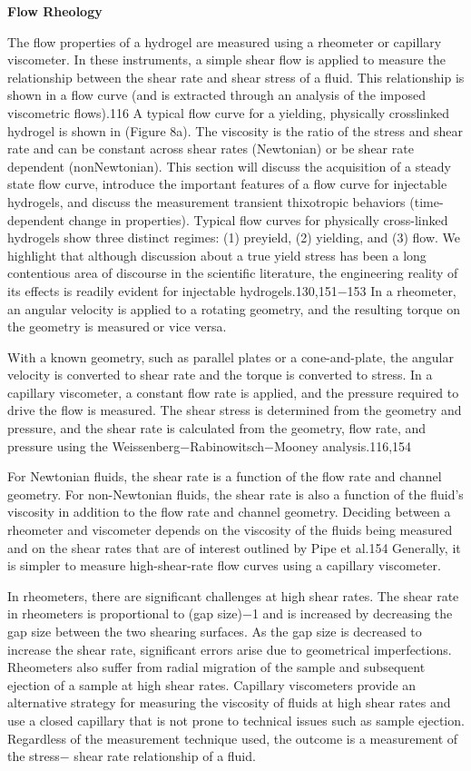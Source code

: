 \documentclass[../../main-notes.tex]{subfiles}
\begin{document}
\textbf{Flow Rheology}

The flow properties of a hydrogel are measured using a rheometer or capillary viscometer.  
In these instruments, a simple shear flow is applied to measure the relationship between the shear rate and shear stress of a fluid. 
This relationship is shown in a flow curve (and is extracted through an analysis of the imposed viscometric  flows).116 
A typical flow curve for a yielding, physically crosslinked hydrogel is shown in (Figure 8a). 
The viscosity is the ratio of the stress and shear rate and can be constant across shear rates (Newtonian) or be shear rate dependent (nonNewtonian). 
This section will discuss the acquisition of a steady state flow curve, introduce the important features of a flow curve for injectable hydrogels, and discuss the measurement transient thixotropic behaviors (time-dependent change in properties). 
Typical flow curves for physically cross-linked hydrogels show three distinct regimes: (1) preyield, (2) yielding, and (3) flow. 
We highlight that although discussion about a true yield stress has been a long contentious area of discourse in the scientific literature, the engineering reality of  its effects is readily evident for injectable hydrogels.130,151−153 
In a rheometer, an angular velocity is applied to a rotating geometry, and the resulting torque on the geometry is measuredor vice versa. 

With a known geometry, such as parallel plates or a cone-and-plate, the angular velocity is converted to shear rate and the torque is converted to stress. 
In a capillary viscometer, a constant flow rate is applied, and the pressure required to drive the flow is measured. 
The shear stress is determined from the geometry and pressure, and the shear rate is calculated from the geometry, flow rate, and pressure using the Weissenberg−Rabinowitsch−Mooney analysis.116,154 

For Newtonian fluids, the shear rate is a function of the flow rate and channel geometry. 
For non-Newtonian fluids, the shear rate is also a function of the fluid’s viscosity in addition to the flow rate and channel geometry. 
Deciding between a rheometer and viscometer depends on the viscosity of the fluids being measured and on the shear rates that are of  interestoutlined by Pipe et al.154 
Generally, it is simpler to measure high-shear-rate flow curves using a capillary viscometer. 

In rheometers, there are significant challenges at high shear rates. 
The shear rate in rheometers is proportional  to (gap size)−1 and is increased by decreasing the gap size between the two shearing surfaces. 
As the gap size is decreased to increase the shear rate, significant errors arise due to geometrical imperfections. 
Rheometers also suffer from radial migration of the sample and subsequent ejection of a sample at high shear rates. 
Capillary viscometers provide an alternative strategy for measuring the viscosity of fluids at high shear rates and use a closed capillary that is not prone to technical issues such as sample ejection. 
Regardless of the measurement technique used, the outcome is a measurement of the stress− shear rate relationship of a fluid. 
\end{document}
